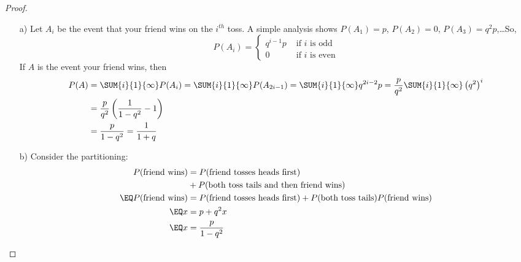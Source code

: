 \documentclass[12pt,titlepage]{article}
\begin{document}
\begin{proof}
\begin{enumerate}
\item[a)] Let $A_i$ be the event that your friend wins on the $i^{th}$ toss. A simple analysis shows $P(A_1) = p$, $P(A_2) = 0$, $P(A_3) = q^2 p$,\ldots So,
\[
P(A_i) = 
\begin{cases}
q^{i-1} p &\text{ if $i$ is odd} \\
0 &\text{ if $i$ is even}
\end{cases}
\]
If $A$ is the event your friend wins, then 
\begin{align*}
P(A) &= \SUM{i}{1}{\infty} P(A_i) = \SUM{i}{1}{\infty} P(A_{2i-1}) = \SUM{i}{1}{\infty} q^{2i-2} p = \frac{p}{q^2} \SUM{i}{1}{\infty} \left(q^2\right)^{i} \\
&= \frac{p}{q^2} \left(\frac{1}{1-q^2} - 1 \right) \\
&= \frac{p}{1-q^2} = \frac{1}{1+q}
\end{align*}
\item[b)] Consider the  partitioning:
\begin{align*}
P(\text{friend wins}) &= P(\text{friend tosses heads first}) \\
&+ P(\text{both toss tails and then friend wins}) \\
\EQ P(\text{friend wins}) &= P(\text{friend tosses heads first}) + P(\text{both toss tails})P(\text{friend wins}) \\
\EQ x &= p + q^2 x \\
\EQ x &= \frac{p}{1-q^2}
\end{align*}

\end{enumerate}

\end{proof}
\end{document}
